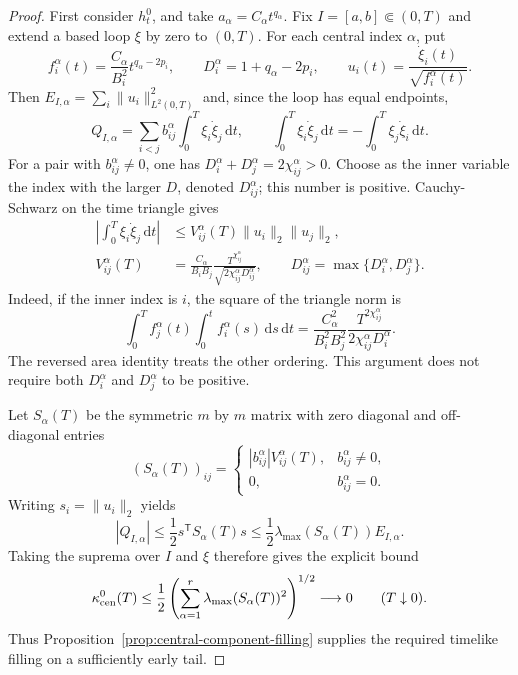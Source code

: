 \documentclass[10pt,a4paper]{article}
\numberwithin{equation}{section}
\theoremstyle{definition}
\theoremstyle{remark}
\newcommand{\dd}{\mathrm d}
\begin{document}
\begin{proof}
First consider $h_t^0$, and take $a_\alpha=C_\alpha t^{q_\alpha}$.
Fix $I=[a,b]\Subset(0,T)$ and extend a based loop $\xi$ by zero to
$(0,T)$.  For each central index $\alpha$, put
\[
 f_i^\alpha(t)=\frac{C_\alpha}{B_i^2}t^{q_\alpha-2p_i},
 \qquad D_i^\alpha=1+q_\alpha-2p_i,
 \qquad u_i(t)=\frac{\dot\xi_i(t)}{\sqrt{f_i^\alpha(t)}}.
\]
Then $E_{I,\alpha}=\sum_i\|u_i\|_{L^2(0,T)}^2$ and, since the
loop has equal endpoints,
\[
 Q_{I,\alpha}=\sum_{i<j}b_{ij}^{\alpha}
                  \int_0^T\xi_i\dot\xi_j\,\dd t,
 \qquad
 \int_0^T\xi_i\dot\xi_j\,\dd t
       =-\int_0^T\xi_j\dot\xi_i\,\dd t.
\]
For a pair with $b_{ij}^{\alpha}\ne0$, one has
$D_i^\alpha+D_j^\alpha=2\chi_{ij}^{\alpha}>0$.  Choose as the inner
variable the index with the larger $D$, denoted $D_{ij}^{\alpha}$;
this number is positive.  Cauchy-Schwarz on the time triangle gives
\begin{align*}
 \left|\int_0^T\xi_i\dot\xi_j\,\dd t\right|
 &\le V_{ij}^{\alpha}(T)\|u_i\|_2\|u_j\|_2,\\
 V_{ij}^{\alpha}(T)
 &=\frac{C_\alpha}{B_iB_j}
   \frac{T^{\chi_{ij}^{\alpha}}}
        {\sqrt{2\chi_{ij}^{\alpha}D_{ij}^{\alpha}}},
 \qquad
 D_{ij}^{\alpha}=\max\{D_i^\alpha,D_j^\alpha\}.
\end{align*}
Indeed, if the inner index is $i$, the square of the triangle norm is
\[
 \int_0^T f_j^\alpha(t)\int_0^t f_i^\alpha(s)\,\dd s\,\dd t
 =\frac{C_\alpha^2}{B_i^2B_j^2}
   \frac{T^{2\chi_{ij}^{\alpha}}}
        {2\chi_{ij}^{\alpha}D_i^\alpha}.
\]
The reversed area identity treats the other ordering.  This argument
does not require both $D_i^\alpha$ and $D_j^\alpha$ to be positive.

Let $S_\alpha(T)$ be the symmetric $m$ by $m$ matrix with zero
diagonal and off-diagonal entries
\[
 (S_\alpha(T))_{ij}=
 \begin{cases}
 |b_{ij}^{\alpha}|V_{ij}^{\alpha}(T),&b_{ij}^{\alpha}\ne0,\\
 0,&b_{ij}^{\alpha}=0.
 \end{cases}
\]
Writing $s_i=\|u_i\|_2$ yields
\[
 |Q_{I,\alpha}|
 \le\frac12s^{\mathsf T}S_\alpha(T)s
 \le\frac12\lambda_{\max}(S_\alpha(T))E_{I,\alpha}.
\]
Taking the suprema over $I$ and $\xi$ therefore gives the explicit
bound
\begin{equation}
 \kappa_{\rm cen}^0(T)
 \le\frac12\left(\sum_{\alpha=1}^r
       \lambda_{\max}(S_\alpha(T))^2\right)^{1/2}
 \longrightarrow0\qquad(T\downarrow0).
 \label{eq:anisotropic-bracket-matrix-bound}
\end{equation}
Thus Proposition~\ref{prop:central-component-filling} supplies the
required timelike filling on a sufficiently early tail.


\end{proof}
\end{document}
